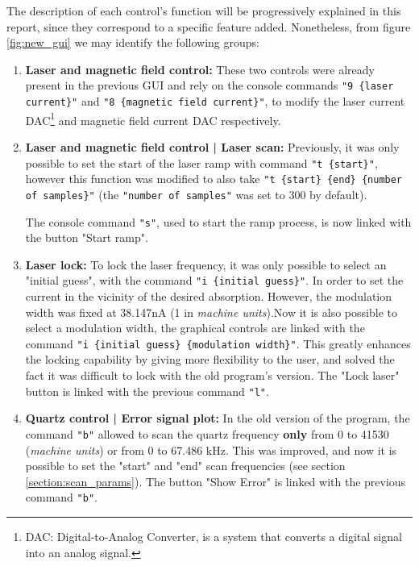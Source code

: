 \documentclass[a4paper,12pt]{article}
\begin{document}
The description of each control's function will be progressively explained in this report, since they correspond to a specific feature added. Nonetheless, from figure \ref{fig:new_gui} we may identify the following groups:

\begin{enumerate}[wide, labelwidth=!, labelindent=0pt]
	\item \textbf{Laser and magnetic field control:} \newline These two controls were already present in the previous GUI and rely on the console commands \texttt{"9 \{laser current\}"} and  \texttt{"8 \{magnetic field current\}"}, to modify the laser current DAC\footnote{DAC: Digital-to-Analog Converter, is a system that converts a digital signal into an analog signal.} and magnetic field current DAC respectively. %
	
	\item \textbf{Laser and magnetic field control | Laser scan:} \newline Previously, it was only possible to set the start of the laser ramp with command \mbox{\texttt{"t \{start\}"}}, however this function was modified to also take \mbox{\texttt{"t \{start\} \{end\} \{number of samples\}"}} \break(the \texttt{"number of samples"} was set to 300 by default).
	
	The console command \texttt{"s"}, used to start the ramp process, is now linked with the button "Start ramp".
	\item \textbf{Laser lock:} \newline To lock the laser frequency, it was only possible to select an "initial guess", with the command \mbox{\texttt{"i \{initial guess\}"}}. In order to set the current in the vicinity of the desired absorption. However, the modulation width was fixed at 38.147nA (1 in \textit{machine units}).\newline Now it is also possible to select a modulation width, the graphical controls are linked with the command \mbox{\texttt{"i \{initial guess\} \{modulation width\}"}}. This greatly enhances the locking capability by giving more flexibility to the user, and solved the fact it was difficult to lock with the old program's version. %
	\newline The "Lock laser" button is linked with the previous command \texttt{"l"}.
 	\item \textbf{Quartz control | Error signal plot:} \newline In the old version of the program, the command \texttt{"b"} allowed to scan the quartz frequency \textbf{only} from 0 to 41530 (\textit{machine units}) or from 0 to 67.486 kHz. This was improved, and now it is possible to set the "start" and "end" scan frequencies (see section \ref{section:scan_params}).
 	\newline The button "Show Error" is linked with the previous command \texttt{"b"}.
\end{enumerate}
\endgroup
\end{document}
